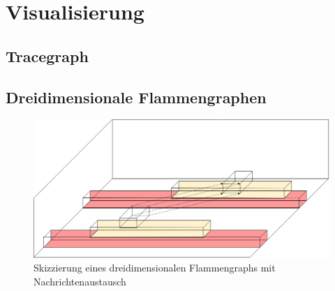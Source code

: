 \section{Visualisierung}
\label{section:Visualisierung}

\subsection{Tracegraph}
\subsection{Dreidimensionale Flammengraphen}
\begin{figure}[!ht]
	\centering
	\includegraphics[scale=0.3]{img/Problembeschreibung/flamegraph_3D.png}
	\caption[3D Flammengraph]{Skizzierung eines dreidimensionalen Flammengraphs mit Nachrichtenaustausch}
	\label{fig:flamegraph_3D}
\end{figure}

